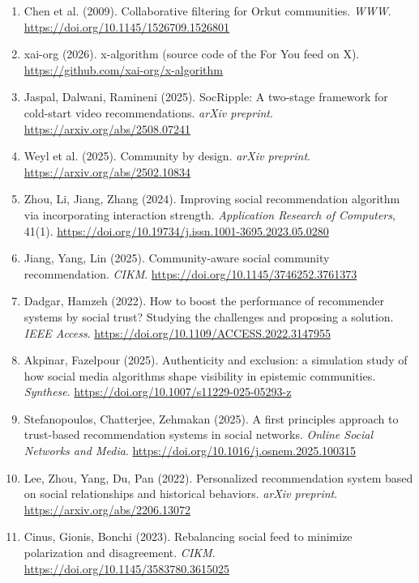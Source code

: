 {\begin{enumerate}[leftmargin=*, label=\arabic*., ref=\arabic*, itemsep=0.8em]
  \item\label{ref:chen2009} Chen et al. (2009). Collaborative filtering for Orkut communities. \textit{WWW}. \url{https://doi.org/10.1145/1526709.1526801} %
  \item\label{ref:xai-x-algorithm} xai-org (2026). x-algorithm (source code of the For You feed on X). \url{https://github.com/xai-org/x-algorithm} %
  \item\label{ref:jaspal2025} Jaspal, Dalwani, Ramineni (2025). SocRipple: A two-stage framework for cold-start video recommendations. \textit{arXiv preprint}. \url{https://arxiv.org/abs/2508.07241} %
  \item\label{ref:weyl2025} Weyl et al. (2025). Community by design. \textit{arXiv preprint}. \url{https://arxiv.org/abs/2502.10834} %
  \item\label{ref:zhou2024} Zhou, Li, Jiang, Zhang (2024). Improving social recommendation algorithm via incorporating interaction strength. \textit{Application Research of Computers}, 41(1). \url{https://doi.org/10.19734/j.issn.1001-3695.2023.05.0280} %
  \item\label{ref:jiang2025} Jiang, Yang, Lin (2025). Community-aware social community recommendation. \textit{CIKM}. \url{https://doi.org/10.1145/3746252.3761373} %
  \item\label{ref:dadgar2022} Dadgar, Hamzeh (2022). How to boost the performance of recommender systems by social trust? Studying the challenges and proposing a solution. \textit{IEEE Access}. \url{https://doi.org/10.1109/ACCESS.2022.3147955} %
  \item\label{ref:akpinar2025} Akpinar, Fazelpour (2025). Authenticity and exclusion: a simulation study of how social media algorithms shape visibility in epistemic communities. \textit{Synthese}. \url{https://doi.org/10.1007/s11229-025-05293-z} %
  \item\label{ref:stefanopoulos2025} Stefanopoulos, Chatterjee, Zehmakan (2025). A first principles approach to trust-based recommendation systems in social networks. \textit{Online Social Networks and Media}. \url{https://doi.org/10.1016/j.osnem.2025.100315} %
  \item\label{ref:lee2022} Lee, Zhou, Yang, Du, Pan (2022). Personalized recommendation system based on social relationships and historical behaviors. \textit{arXiv preprint}. \url{https://arxiv.org/abs/2206.13072} %
  \item\label{ref:cinus2023} Cinus, Gionis, Bonchi (2023). Rebalancing social feed to minimize polarization and disagreement. \textit{CIKM}. \url{https://doi.org/10.1145/3583780.3615025} %

\end{enumerate}}
